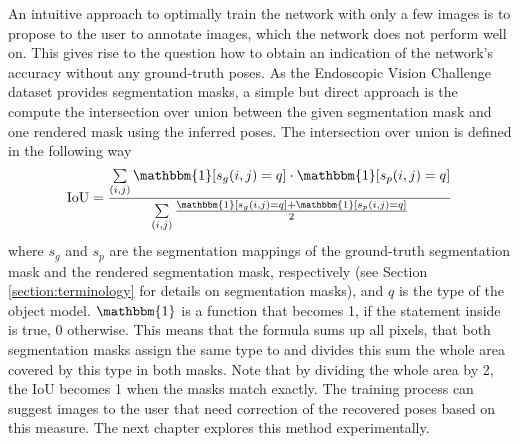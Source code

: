 An intuitive approach to optimally train the network with only a few images is to propose to the user to annotate images, which the network does not perform well on. This gives rise to the question how to obtain an indication of the network's accuracy without any ground-truth poses. As the Endoscopic Vision Challenge dataset provides segmentation masks, a simple but direct approach is the compute the intersection over union between the given segmentation mask and one rendered mask using the inferred poses. The intersection over union is defined in the following way
\begin{align*}
\text{IoU} = \frac{\sum\limits_{(i, j)} \mathbbm{1}[s_g(i, j) = q] \cdot  \mathbbm{1}[s_p(i, j) = q]}{\sum\limits_{(i, j)} \frac{\mathbbm{1}[s_g(i, j) = q] +  \mathbbm{1}[s_p(i, j) = q]}{2}}
\end{align*}
where $s_g$ and $s_p$ are the segmentation mappings of the ground-truth segmentation mask and the rendered segmentation mask, respectively (see Section \ref{section:terminology} for details on segmentation masks), and $q$ is the type of the object model. $\mathbbm{1}$ is a function that becomes 1, if the statement inside is true, 0 otherwise. This means that the formula sums up all pixels, that both segmentation masks assign the same type to and divides this sum the whole area covered by this type in both masks. Note that by dividing the whole area by 2, the $\text{IoU}$ becomes 1 when the masks match exactly. The training process can suggest images to the user that need correction of the recovered poses based on this measure. The next chapter explores this method experimentally.